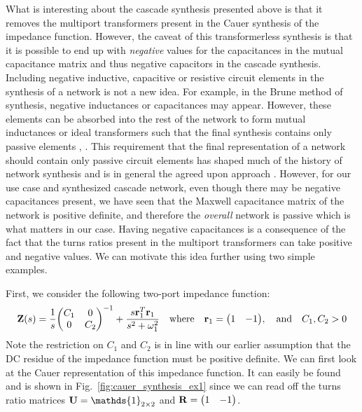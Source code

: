 What is interesting about the cascade synthesis presented above is that it removes the multiport transformers present in the Cauer synthesis of the impedance function. However, the caveat of this transformerless synthesis is that it is possible to end up with \textit{negative} values for the capacitances in the mutual capacitance matrix and thus negative capacitors in the cascade synthesis. Including negative inductive, capacitive or resistive circuit elements in the synthesis of a network is not a new idea. For example, in the Brune method of synthesis, negative inductances or capacitances may appear. However, these elements can be absorbed into the rest of the network to form mutual inductances or ideal transformers such that the final synthesis contains only passive elements \cite{brune_synthesis}, \cite[Chapter 9.4]{guillemin_synthesis}. This requirement that the final representation of a network should contain only passive circuit elements has shaped much of the history of network synthesis and is in general the agreed upon approach \cite[Chapter 1.2]{cauer_linear_comm}. However, for our use case and synthesized cascade network, even though there may be negative capacitances present, we have seen that the Maxwell capacitance matrix of the network is positive definite, and therefore the \textit{overall} network is passive which is what matters in our case. Having negative capacitances is a consequence of the fact that the turns ratios present in the multiport transformers can take positive and negative values. We can motivate this idea further using two simple examples.

First, we consider the following two-port impedance function:
\begin{equation}\label{eq:impedance_ex1}
    \vb{Z}(s) = \frac{1}{s}\mqty(C_1 & 0 \\ 0 & C_2)^{-1} + \frac{s \vb{r}_1^T \vb{r}_1 }{s^2 + \omega_1^2} \quad \text{where}\quad \vb{r}_1 = \mqty(1 & -1), \quad \text{and}\quad C_1,C_2 > 0
\end{equation}
Note the restriction on $C_1$ and $C_2$ is in line with our earlier assumption that the DC residue of the impedance function must be positive definite. We can first look at the Cauer representation of this impedance function. It can easily be found and is shown in Fig.\ \ref{fig:cauer_synthesis_ex1} since we can read off the turns ratio matrices $\vb{U} = \mathds{1}_{2\times 2}$ and $\vb{R} = \mqty(1 & -1)$.

